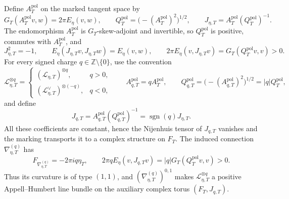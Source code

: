 Define \(A_T^{\mathrm{pol}}\) on the marked tangent space by
\begin{equation}
 G_T(A_T^{\mathrm{pol}}v,w)=2\pi E_\eta(v,w),
 \qquad
 Q_T^{\mathrm{pol}}=\bigl(-(A_T^{\mathrm{pol}})^2\bigr)^{1/2},
 \qquad
 J_{\eta,T}=A_T^{\mathrm{pol}}(Q_T^{\mathrm{pol}})^{-1}.
 \label{cusp-native-full-flux-polar-complex-structure}
\end{equation}
The endomorphism \(A_T^{\mathrm{pol}}\) is \(G_T\)-skew-adjoint and invertible,
so \(Q_T^{\mathrm{pol}}\) is positive, commutes with
\(A_T^{\mathrm{pol}}\), and
\begin{equation}
 J_{\eta,T}^2=-1,
 \qquad
 E_\eta(J_{\eta,T}v,J_{\eta,T}w)=E_\eta(v,w),
 \qquad
 2\pi E_\eta(v,J_{\eta,T}v)
 =G_T(Q_T^{\mathrm{pol}}v,v)>0.
 \label{cusp-native-full-flux-polar-properties}
\end{equation}
For every signed charge \(q\in\mathbb Z\setminus\{0\}\), use the convention
\begin{equation}
 \mathscr L_{\eta,T}^{\otimes q}=
 \begin{cases}
  (\mathscr L_{\eta,T})^{\otimes q},&q>0,\\
  (\mathscr L_{\eta,T}^{\vee})^{\otimes(-q)},&q<0,
 \end{cases}
 \qquad
 A_{q,T}^{\mathrm{pol}}=qA_T^{\mathrm{pol}},
 \qquad
 Q_{q,T}^{\mathrm{pol}}
 =\bigl(-(A_{q,T}^{\mathrm{pol}})^2\bigr)^{1/2}
 =|q|Q_T^{\mathrm{pol}},
 \label{cusp-native-full-flux-signed-charge-bundle}
\end{equation}
and define
\begin{equation}
 J_{q,T}=A_{q,T}^{\mathrm{pol}}(Q_{q,T}^{\mathrm{pol}})^{-1}
 =\operatorname{sgn}(q)J_{\eta,T}.
 \label{cusp-native-full-flux-signed-charge-complex-structure}
\end{equation}
All these coefficients are constant, hence the Nijenhuis tensor of
\(J_{q,T}\) vanishes and the marking transports it to a complex structure on
\(F_T\).  The induced connection \(\nabla_{\eta,T}^{(q)}\) has
\begin{equation}
 F_{\nabla_{\eta,T}^{(q)}}=-2\pi i q\eta_T,
 \qquad
 2\pi qE_\eta(v,J_{q,T}v)
 =|q|G_T(Q_T^{\mathrm{pol}}v,v)>0.
 \label{cusp-native-full-flux-signed-charge-positivity}
\end{equation}
Thus its curvature is of type \((1,1)\), and
\((\nabla_{\eta,T}^{(q)})^{0,1}\) makes
\(\mathscr L_{\eta,T}^{\otimes q}\) a positive Appell--Humbert line bundle on
the auxiliary complex torus \((F_T,J_{q,T})\).

